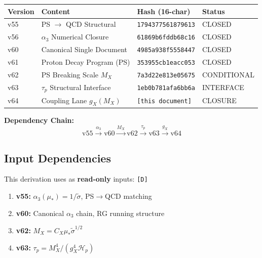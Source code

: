 \documentclass[11pt,a4paper]{article}
\newcommand{\tagD}{\textcolor{green!50!black}{\texttt{[D]}}}
\theoremstyle{definition}
\begin{document}
\begin{center}
\begin{tabular}{llll}
\toprule
Version & Content & Hash (16-char) & Status \\
\midrule
v55 & PS $\to$ QCD Structural & \texttt{1794377561879613} & CLOSED \\
v56 & $\alpha_3$ Numerical Closure & \texttt{61869b6fddb68c16} & CLOSED \\
v60 & Canonical Single Document & \texttt{4985a938f5558447} & CLOSED \\
v61 & Proton Decay Program (PS) & \texttt{353955cb1eacc053} & CLOSED \\
v62 & PS Breaking Scale $M_X$ & \texttt{7a3d22e813e05675} & CONDITIONAL \\
v63 & $\tau_p$ Structural Interface & \texttt{1eb0b781afa6bb6a} & INTERFACE \\
v64 & Coupling Lane $g_X(M_X)$ & \texttt{[this document]} & CLOSURE \\
\bottomrule
\end{tabular}
\end{center}

\textbf{Dependency Chain:}
\begin{equation}
\label{eq:dependency-chain}
\text{v55} \xrightarrow{\alpha_3} \text{v60} \xrightarrow{M_X} \text{v62}
\xrightarrow{\tau_p} \text{v63} \xrightarrow{g_X} \text{v64}
\end{equation}

\subsection{Input Dependencies}
\label{subsec:input-deps}

This derivation uses as \textbf{read-only} inputs: \tagD{}
\begin{enumerate}
  \item \textbf{v55:} $\alpha_3(\mu_*) = 1/\tilde{\sigma}$, PS$\to$QCD matching
  \item \textbf{v60:} Canonical $\alpha_3$ chain, RG running structure
  \item \textbf{v62:} $M_X = C_X \mu_* \tilde{\sigma}^{1/2}$
  \item \textbf{v63:} $\tau_p = M_X^4/(g_X^4 \mathcal{H}_p)$
\end{enumerate}

\end{document}
